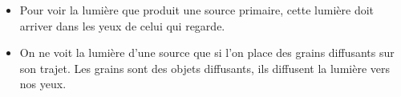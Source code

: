 \begin{mybilan}
	\begin{itemize}
		\item Pour voir la lumière que produit une source primaire, cette lumière doit arriver dans les yeux de celui qui regarde.
		\item On ne voit la lumière d'une source que si l'on place des grains diffusants sur son trajet. Les grains sont des objets diffusants, ils diffusent la lumière vers nos yeux.
	\end{itemize}
	
\end{mybilan}
